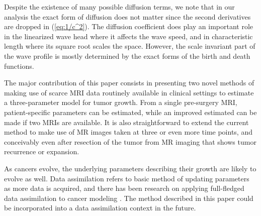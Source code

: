 \documentclass{aims}
\numberwithin{equation}{section}
\begin{document}
Despite the existence of many possible diffusion terms, we note that in our analysis the exact form of diffusion does not
matter since the second derivatives are dropped in (\ref{eq:1/c^2}).
The diffusion coefficient does play an important role in the linearized
wave head where it affects the wave speed, and in characteristic length
where its square root scales the space. However, the scale invariant
part of the wave profile is mostly determined by the exact forms of the
birth and death functions.  %

The major contribution of this paper consists in presenting two novel methods
of making use of scarce MRI data routinely available in clinical
settings to estimate a three-parameter model for tumor growth.  From a single pre-surgery MRI, patient-specific parameters can be estimated, while an improved estimated can be made if two MRIs are available.  It is also straightforward to extend the current method to make use of MR images taken at three or even more time points, and conceivably even after resection of the tumor from MR imaging that shows tumor recurrence or expansion. 

As cancers evolve, the underlying parameters describing their growth are likely to evolve as well.  Data assimilation refers to basic method of updating parameters as more data is acquired, and there has been research on applying full-fledged  data assimilation to cancer modeling \cite{Kostelich2011,McDaniel2013}.  The method described in this paper could be incorporated into a data assimilation context in the future.


\end{document}
